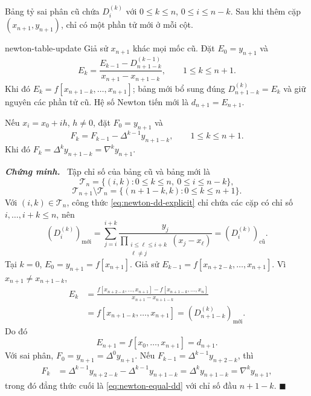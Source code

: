 \documentclass[12pt,a4paper,oneside]{book}
\numberwithin{algorithm}{chapter}
\theoremstyle{definition}
\newenvironment{chungminh}{\par\medskip\noindent\textbf{\textit{\color{mainblue}Chứng minh.}}\ }{\hfill$\blacksquare$\par\medskip}
\begin{document}
Bảng tỷ sai phân cũ chứa $D_i^{(k)}$ với $0\leq k\leq n$, $0\leq i\leq n-k$. Sau khi thêm cặp $(x_{n+1},y_{n+1})$, chỉ có một phần tử mới ở mỗi cột.
\begin{menhde}{}{newton-table-update}
Giả sử $x_{n+1}$ khác mọi mốc cũ. Đặt $E_0=y_{n+1}$ và
\begin{equation}\label{eq:newton-dd-update}
 E_k=\frac{E_{k-1}-D_{n+1-k}^{(k-1)}}{x_{n+1}-x_{n+1-k}},
 \qquad1\leq k\leq n+1.
\end{equation}
Khi đó $E_k=f[x_{n+1-k},\ldots,x_{n+1}]$; bảng mới bổ sung đúng $D_{n+1-k}^{(k)}=E_k$ và giữ nguyên các phần tử cũ. Hệ số Newton tiến mới là $d_{n+1}=E_{n+1}$.

Nếu $x_i=x_0+ih$, $h\ne0$, đặt $F_0=y_{n+1}$ và
\begin{equation}\label{eq:newton-difference-update}
 F_k=F_{k-1}-\Delta^{k-1}y_{n+1-k},\qquad1\leq k\leq n+1.
\end{equation}
Khi đó $F_k=\Delta^ky_{n+1-k}=\nabla^ky_{n+1}$.
\end{menhde}
\begin{chungminh}
Tập chỉ số của bảng cũ và bảng mới là
\[
 \mathcal T_n=\{(i,k):0\leq k\leq n,\ 0\leq i\leq n-k\},
\]
\[
 \mathcal T_{n+1}\setminus\mathcal T_n
 =\{(n+1-k,k):0\leq k\leq n+1\}.
\]
Với $(i,k)\in\mathcal T_n$, công thức \eqref{eq:newton-dd-explicit} chỉ chứa các cặp có chỉ số $i,\ldots,i+k\leq n$, nên
\[
 (D_i^{(k)})_{\text{mới}}
 =\sum_{j=i}^{i+k}\frac{y_j}{\prod_{\substack{i\leq\ell\leq i+k\\\ell\ne j}}(x_j-x_\ell)}
 =(D_i^{(k)})_{\text{cũ}}.
\]
Tại $k=0$, $E_0=y_{n+1}=f[x_{n+1}]$. Giả sử
$E_{k-1}=f[x_{n+2-k},\ldots,x_{n+1}]$. Vì $x_{n+1}\ne x_{n+1-k}$,
\begin{align*}
 E_k
 &=\frac{f[x_{n+2-k},\ldots,x_{n+1}]-f[x_{n+1-k},\ldots,x_n]}
 {x_{n+1}-x_{n+1-k}}\\
 &=f[x_{n+1-k},\ldots,x_{n+1}]
 =(D_{n+1-k}^{(k)})_{\text{mới}}.
\end{align*}
Do đó
\[
 E_{n+1}=f[x_0,\ldots,x_{n+1}]=d_{n+1}.
\]
Với sai phân, $F_0=y_{n+1}=\Delta^0y_{n+1}$. Nếu
$F_{k-1}=\Delta^{k-1}y_{n+2-k}$, thì
\begin{align*}
 F_k
 &=\Delta^{k-1}y_{n+2-k}-\Delta^{k-1}y_{n+1-k}
 =\Delta^ky_{n+1-k}
 =\nabla^ky_{n+1},
\end{align*}
trong đó đẳng thức cuối là \eqref{eq:newton-equal-dd} với chỉ số đầu $n+1-k$.
\end{chungminh}
\end{document}
